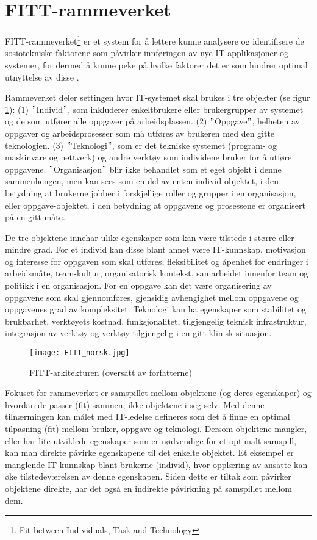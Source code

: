 \section{FITT-rammeverket}
\label{sec:fitt-rammeverket}

FITT-rammeverket\footnote{Fit between Individuals, Task and Technology} er et system for å lettere kunne analysere og identifisere de sosiotekniske faktorene som påvirker innføringen av nye IT-applikasjoner og -systemer, for dermed å kunne peke på hvilke faktorer det er som hindrer optimal utnyttelse av disse \citep{FITT}.

\noindent
Rammeverket deler settingen hvor IT-systemet skal brukes i tre objekter (se figur \ref{FITT-arkitekturen}): (1) $"$Individ$"$, som inkluderer enkeltbrukere eller brukergrupper av systemet og de som utfører alle oppgaver på arbeidsplassen. (2) $"$Oppgave$"$, helheten av oppgaver og arbeidsprosesser som må utføres av brukeren med den gitte teknologien. (3) $"$Teknologi$"$, som er det tekniske systemet (program- og maskinvare og nettverk) og andre verktøy som individene bruker for å utføre oppgavene.
$"$Organisasjon$"$ blir ikke behandlet som et eget objekt i denne sammenhengen, men kan sees som en del av enten individ-objektet, i den betydning at brukerne jobber i forskjellige roller og grupper i en organisasjon, eller oppgave-objektet, i den betydning at oppgavene og prosessene er organisert på en gitt måte.

\noindent
De tre objektene innehar ulike egenskaper som kan være tilstede i større eller mindre grad. For et individ kan disse blant annet være IT-kunnskap, motivasjon og interesse for oppgaven som skal utføres, fleksibilitet og åpenhet for endringer i arbeidsmåte, team-kultur, organisatorisk kontekst, samarbeidet innenfor team og politikk i en organisasjon. For en oppgave kan det være organisering av oppgavene som skal gjennomføres, gjensidig avhengighet mellom oppgavene og oppgavenes grad av kompleksitet. Teknologi kan ha egenskaper som stabilitet og brukbarhet, verktøyets kostnad, funksjonalitet, tilgjengelig teknisk infrastruktur, integrasjon av verktøy og verktøy tilgjengelig i en gitt klinisk situasjon.

\begin{figure}[H]
\centering
\texttt{[image: FITT\_norsk.jpg]}
\caption{FITT-arkitekturen \citep{FITT} (oversatt av forfatterne)}
\label{FITT-arkitekturen}
\end{figure}

\noindent
Fokuset for rammeverket er samspillet mellom objektene (og deres egenskaper) og hvordan de passer (fit) sammen, ikke objektene i seg selv. Med denne tilnærmingen kan målet med IT-ledelse defineres som det å finne en optimal tilpasning (fit) mellom bruker, oppgave og teknologi. Dersom objektene mangler, eller har lite utviklede egenskaper som er nødvendige for et optimalt samspill, kan man direkte påvirke egenskapene til det enkelte objektet. Et eksempel er manglende IT-kunnskap blant brukerne (individ), hvor opplæring av ansatte kan øke tilstedeværelsen av denne egenskapen. Siden dette er tiltak som påvirker objektene direkte, har det også en indirekte påvirkning på samspillet mellom dem.

